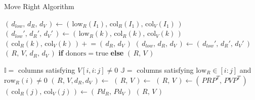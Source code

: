 \documentclass[sn-mathphys]{sn-jnl}
\begin{document}
\begin{algorithm}[!htb]
	\caption{Move Right Algorithm}\label{alg:mr}
    \begin{algorithmic}[1]
            \State $(\, d_{low}, \, d_R, \, d_V \,) \gets ( \, \mathrm{low}_R(I_1), \, \mathrm{col}_R(I_1), \, \mathrm{col}_V(I_1) \, )$
        		\State $( \, d_{low}', \, d_R', \, d_V' \, ) \gets ( \, \mathrm{low}_R(k), \, \mathrm{col}_R(k), \, \mathrm{col}_V(k) \, )$
        		\State $( \, \mathrm{col}_R(k), \, \mathrm{col}_V(k) \, ) \mathrel{+}= (\, d_R, \, d_V \,) $
        			\State $(\, d_{low}, \, d_R, \, d_V \,) \gets (\, d_{low}', \, d_R', \, d_V' \, )$
        		\EndIf
        	\EndFor 
        	\State \Return $(\, R, \, V, \, d_R, \, d_V \, )$ \textbf{if} $\mathrm{donors}=\mathrm{true}$ \textbf{else} $(\, R, \, V \, )$
        \EndFunction
    \end{algorithmic}
    \begin{algorithmic}[1]
            \State $\mathbb{I} =$ columns satisfying $V[i, i:j] \neq 0$ %
            \State $\mathbb{J} = $ columns satisfying $\mathrm{low}_R \in [i:j]$ and $\mathrm{row}_R(i) \neq 0$ %
            \State $(\, R, \, V, d_R, d_V \,) \gets $  
            \State $(\, R, \, V \,) \gets $ 
            \State $(\, R, \, V\, ) \gets (\, P R P^T, \, P V P^T\,)$  %
            \State $(\, \mathrm{col}_R(j), \, \mathrm{col}_V(j) \, ) \gets (\, P d_R, \, P d_V \,)$
            \State \Return $(\, R, \, V\,)$
        \EndFunction
    \end{algorithmic}
\end{algorithm}
\end{document}
